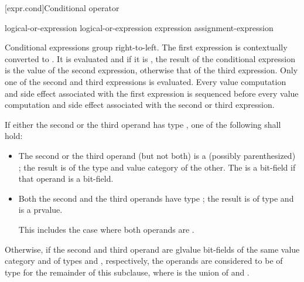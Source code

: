 [expr.cond]{Conditional operator}%
%
%
%

\begin{bnf}
\br
    logical-or-expression\br
    logical-or-expression  expression \terminal{:} assignment-expression
\end{bnf}

\pnum
Conditional expressions group right-to-left. The first expression is
contextually converted to .
It is
evaluated and if it is , the result of the conditional
expression is the value of the second expression, otherwise that of the
third expression. Only one of the second and third expressions is
evaluated. Every
%
value computation and side effect associated with the
first expression is sequenced before every value computation and side
effect associated with the second or third expression.

\pnum
If either the second or the third operand has type ,
one of the following shall hold:

\begin{itemize}
%
\item The second or the third operand (but not both) is a (possibly
parenthesized) ; the result
is of the type and value category of the other.
The 
is a bit-field if that operand is a bit-field.

\item Both the second and the third operands have type ; the
result is of type  and is a prvalue. \begin{note} This
includes the case where both operands are .
\end{note}
\end{itemize}

\pnum
Otherwise, if the second and third operand are glvalue bit-fields
of the same value category and
of types   and  , respectively,
the operands are considered to be of type  
for the remainder of this subclause,
where  is the union of  and .

